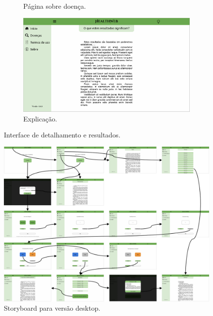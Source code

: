 \begin{figure}[htbp]
\begin{subfigure}{0.49\linewidth}
		\caption{Página sobre doença.}
		\label{fig:desktop:disease_page}
	\end{subfigure}
	\hfill
	\begin{subfigure}{0.49\linewidth}
		\centering
		\includegraphics[width=\linewidth]{figure/prototype/desktop/meaning.png}
		\caption{Explicação.}
		\label{fig:desktop:meaning}
	\end{subfigure}
	\caption{Interface de detalhamento e resultados.}
	\label{fig:desktop:results_this_disease_disease_page_meaning}
\end{figure}

\begin{figure}[htbp]
	\centering
	\includegraphics[width=\linewidth]{figure/prototype/desktop/storyboard.png}
	\caption{Storyboard para versão desktop.}
	\label{fig:desktop:story}
\end{figure}